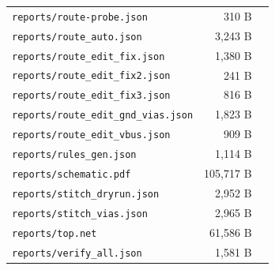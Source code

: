 \documentclass[11pt,a4paper]{article}
\begin{document}
{\begin{longtable}{p{9cm}rp{4cm}}
\texttt{reports/route-probe.json} & 310 B &  \\
\texttt{reports/route\_auto.json} & 3,243 B &  \\
\texttt{reports/route\_edit\_fix.json} & 1,380 B &  \\
\texttt{reports/route\_edit\_fix2.json} & 241 B &  \\
\texttt{reports/route\_edit\_fix3.json} & 816 B &  \\
\texttt{reports/route\_edit\_gnd\_vias.json} & 1,823 B &  \\
\texttt{reports/route\_edit\_vbus.json} & 909 B &  \\
\texttt{reports/rules\_gen.json} & 1,114 B &  \\
\texttt{reports/schematic.pdf} & 105,717 B &  \\
\texttt{reports/stitch\_dryrun.json} & 2,952 B &  \\
\texttt{reports/stitch\_vias.json} & 2,965 B &  \\
\texttt{reports/top.net} & 61,586 B &  \\
\texttt{reports/verify\_all.json} & 1,581 B &  \\
\bottomrule
\end{longtable}
}
\end{document}
